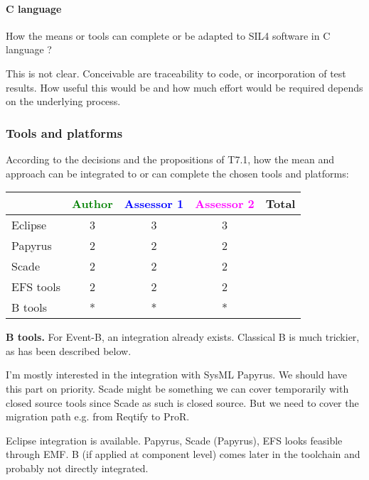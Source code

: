 \paragraph{C language}
How the means or tools can complete or be adapted to SIL4 software in C language ?

\begin{author_comment}
This is not clear.  Conceivable are traceability to code, or incorporation of test results.  How useful this would be and how much effort would be required depends on the underlying process.
\end{author_comment}

\subsubsection{Tools and platforms}

According to the decisions and the propositions of T7.1, how the mean and approach can be integrated to or can complete the chosen tools and platforms:

\begin{tabular}{|l | c | c | c | c|}
\hline
& \textcolor{green}{Author} & \textcolor{blue}{Assessor 1} & \textcolor{magenta}{Assessor 2} & Total \\
\hline
Eclipse & 3 & 3 & 3 &  \\
\hline
Papyrus  & 2 & 2 & 2 & \\
\hline
Scade & 2 & 2 & 2 & \\
\hline
EFS tools & 2 & 2 & 2 & \\
\hline
B tools & * & * & * & \\
\hline
\end{tabular}

\begin{author_comment}
\textbf{B tools.} For Event-B, an integration already exists.  Classical B is much trickier, as has been described below.
\end{author_comment}

\begin{assessor1}
I'm mostly interested in the integration with SysML Papyrus. We should have this part on priority. Scade might be something we can cover temporarily with closed source tools since Scade as such is closed source. But we need to cover the migration path  e.g. from Reqtify to ProR.
\end{assessor1}

\begin{assessor2}
Eclipse integration is available. Papyrus, Scade (Papyrus), EFS looks feasible through EMF. B (if applied at component level) comes later in the toolchain and probably not directly integrated.
\end{assessor2}


